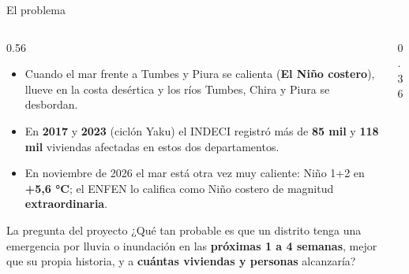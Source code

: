 \documentclass[aspectratio=169,11pt]{beamer}
\begin{document}
\begin{frame}{El problema}
\begin{columns}[T]
\begin{column}{0.56\textwidth}
\begin{itemize}\small
\item Cuando el mar frente a Tumbes y Piura se calienta (\textbf{El Niño costero}), llueve en la costa desértica y los ríos Tumbes, Chira y Piura se desbordan.
\item En \textbf{2017} y \textbf{2023} (ciclón Yaku) el INDECI registró más de \textbf{85 mil} y \textbf{118 mil} viviendas afectadas en estos dos departamentos.
\item En noviembre de 2026 el mar está otra vez muy caliente: Niño 1+2 en \textbf{+5,6 °C}; el ENFEN lo califica como Niño costero de magnitud \textbf{extraordinaria}.
\end{itemize}
\begin{caja}{La pregunta del proyecto}
¿Qué tan probable es que un distrito tenga una emergencia por lluvia o inundación en las \textbf{próximas 1 a 4 semanas}, mejor que su propia historia, y a \textbf{cuántas viviendas y personas} alcanzaría?
\end{caja}
\end{column}
\begin{column}{0.36\textwidth}
\end{column}
\end{columns}
\end{frame}
\end{document}

